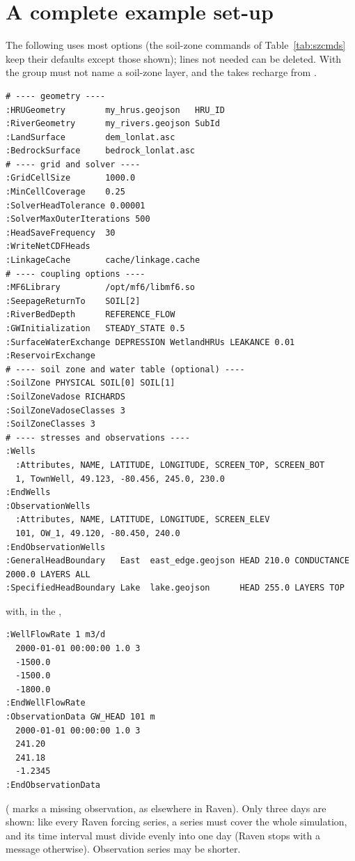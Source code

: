 \section{A complete example set-up}
The following  uses most options (the soil-zone commands of Table~\ref{tab:szcmds} keep their defaults except those shown); lines not needed can be deleted. With  the  group must not name a soil-zone layer, and the  takes recharge from .
\begin{lstlisting}
# ---- geometry ----
:HRUGeometry        my_hrus.geojson   HRU_ID
:RiverGeometry      my_rivers.geojson SubId
:LandSurface        dem_lonlat.asc
:BedrockSurface     bedrock_lonlat.asc
# ---- grid and solver ----
:GridCellSize       1000.0
:MinCellCoverage    0.25
:SolverHeadTolerance 0.00001
:SolverMaxOuterIterations 500
:HeadSaveFrequency  30
:WriteNetCDFHeads
:LinkageCache       cache/linkage.cache
# ---- coupling options ----
:MF6Library         /opt/mf6/libmf6.so
:SeepageReturnTo    SOIL[2]
:RiverBedDepth      REFERENCE_FLOW
:GWInitialization   STEADY_STATE 0.5
:SurfaceWaterExchange DEPRESSION WetlandHRUs LEAKANCE 0.01
:ReservoirExchange
# ---- soil zone and water table (optional) ----
:SoilZone PHYSICAL SOIL[0] SOIL[1]
:SoilZoneVadose RICHARDS
:SoilZoneVadoseClasses 3
:SoilZoneClasses 3
# ---- stresses and observations ----
:Wells
  :Attributes, NAME, LATITUDE, LONGITUDE, SCREEN_TOP, SCREEN_BOT
  1, TownWell, 49.123, -80.456, 245.0, 230.0
:EndWells
:ObservationWells
  :Attributes, NAME, LATITUDE, LONGITUDE, SCREEN_ELEV
  101, OW_1, 49.120, -80.450, 240.0
:EndObservationWells
:GeneralHeadBoundary   East  east_edge.geojson HEAD 210.0 CONDUCTANCE 2000.0 LAYERS ALL
:SpecifiedHeadBoundary Lake  lake.geojson      HEAD 255.0 LAYERS TOP
\end{lstlisting}
with, in the ,
\begin{lstlisting}
:WellFlowRate 1 m3/d
  2000-01-01 00:00:00 1.0 3
  -1500.0
  -1500.0
  -1800.0
:EndWellFlowRate
:ObservationData GW_HEAD 101 m
  2000-01-01 00:00:00 1.0 3
  241.20
  241.18
  -1.2345
:EndObservationData
\end{lstlisting}
( marks a missing observation, as elsewhere in Raven). Only three days are shown: like every Raven
forcing series, a  series must cover the whole simulation, and its time interval must divide evenly
into one day (Raven stops with a message otherwise). Observation series may be shorter.
